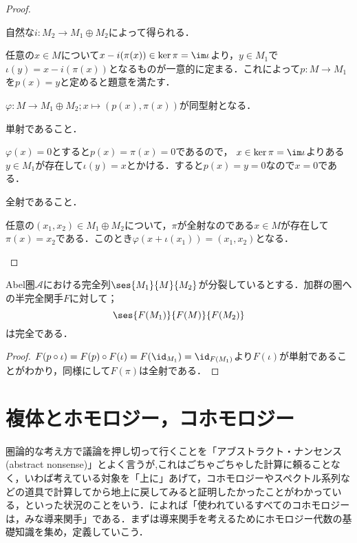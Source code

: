 \begin{proof}
	\begin{eqv}[3]
		\item 自然な$i:M_2\to M_1\oplus M_2$によって得られる．
		
		\item 任意の$x\in M$について$x-i(\pi(x))\in\ker\pi=\im\iota$より，$y\in M_1$で$\iota(y)=x-i(\pi(x))$となるものが一意的に定まる．これによって$p:M\to M_1$を$p(x)=y$と定めると題意を満たす．
		
		\item $\varphi:M\to M_1\oplus M_2;x\mapsto(p(x),\pi(x))$が同型射となる．
		\begin{step}
			\item 単射であること．
			
			$\varphi(x)=0$とすると$p(x)=\pi(x)=0$であるので， $x\in\ker\pi=\im\iota$よりある$y\in M_1$が存在して$\iota(y)=x$とかける．すると$p(x)=y=0$なので$x=0$である．
			
			\item 全射であること．
			
			任意の$(x_1,x_2)\in M_1\oplus M_2$について，$\pi$が全射なのである$x\in M$が存在して$\pi(x)=x_2$である．このとき$\varphi(x+\iota(x_1))=(x_1,x_2)$となる．
		\end{step}
		
	\end{eqv}
\end{proof}

\begin{thm}\label{thm:分裂しているなら完全性は保存される}
	Abel圏$\mathscr{A}$における完全列$\ses{M_1}{M}{M_2}$が分裂しているとする．加群の圏への半完全関手$F$に対して；
	\[\ses{F(M_1)}{F(M)}{F(M_2)}\]
	は完全である．
\end{thm}

\begin{proof}
	$F(p\circ\iota)=F(p)\circ F(\iota)=F(\id_{M_1})=\id_{F(M_1)}$より$F(\iota)$が単射であることがわかり，同様にして$F(\pi)$は全射である．
\end{proof}
\section{複体とホモロジー，コホモロジー}
圏論的な考え方で議論を押し切って行くことを「アブストラクト・ナンセンス(abstract nonsense)」とよく言うが,これはごちゃごちゃした計算に頼ることなく，いわば考えている対象を「上に」あげて，コホモロジーやスペクトル系列などの道具で計算してから地上に戻してみると証明したかったことがわかっている，といった状況のことをいう．\cite{Kato2003}によれば「使われているすべてのコホモロジーは，みな導来関手」である．まずは導来関手を考えるためにホモロジー代数の基礎知識を集め，定義していこう．
	
